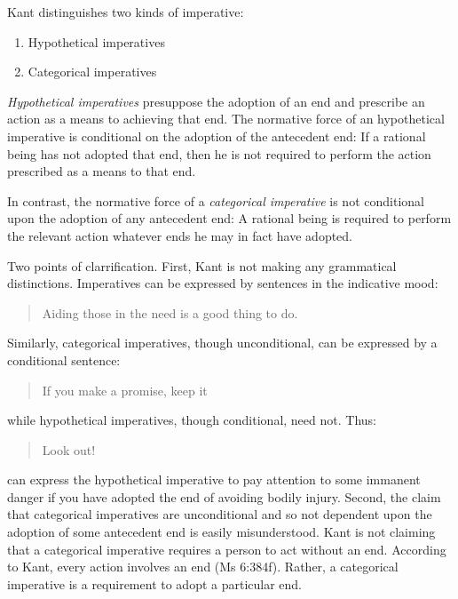 Kant distinguishes two kinds of imperative:

\begin{enumerate}
  \item Hypothetical imperatives
  \item Categorical imperatives
\end{enumerate}

\emph{Hypothetical imperatives} presuppose the adoption of an end and prescribe an action as a means to achieving that end. The normative force of an hypothetical imperative is conditional on the adoption of the antecedent end: If a rational being has not adopted that end, then he is not required to perform the action prescribed as a means to that end.

In contrast, the normative force of a \emph{categorical imperative} is not conditional upon the adoption of any antecedent end: A rational being is required to perform the relevant action whatever ends he may in fact have adopted.

Two points of clarrification. First, Kant is not making any grammatical distinctions. Imperatives can be expressed by sentences in the indicative mood:

\begin{quote}
  Aiding those in the need is a good thing to do.
\end{quote}

Similarly, categorical imperatives, though unconditional, can be expressed by a conditional sentence:

\begin{quote}
  If you make a promise, keep it
\end{quote}

while hypothetical imperatives, though conditional, need not. Thus:

\begin{quote}
  Look out!
\end{quote}

can express the hypothetical imperative to pay attention to some immanent danger if you have adopted the end of avoiding bodily injury. Second, the claim that categorical imperatives are unconditional and so not dependent upon the adoption of some antecedent end is easily misunderstood. Kant is not claiming that a categorical imperative requires a person to act without an end. According to Kant, every action involves an end (Ms 6:384f). Rather, a categorical imperative is a requirement to adopt a particular end. \change

